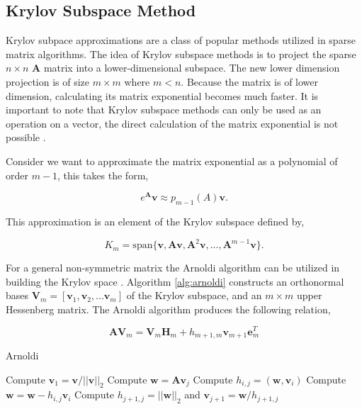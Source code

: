 \subsection{Krylov Subspace Method}
Krylov subpace approximations are a class of popular methods utilized in sparse matrix algorithms. The idea of Krylov subspace methods is to project the sparse $n \times n$ $\boldsymbol{A}$ matrix into a lower-dimensional subspace. The new lower dimension projection is of size $m \times m$ where $m < n$. Because the matrix is of lower dimension, calculating its matrix exponential becomes much faster. It is important to note that Krylov subspace methods can only be used as an operation on a vector, the direct calculation of the matrix exponential is not possible \cite{saad1992}.  

Consider we want to approximate the matrix exponential as a polynomial of order $m-1$, this takes the form,

\begin{equation}
    e^{\boldsymbol{A}}\boldsymbol{v} \approx p_{m-1}(A)\boldsymbol{v}.
    \label{eq:expPolynomailForm}
\end{equation}

\noindent This approximation is an element of the Krylov subspace defined by,

\begin{equation}
    K_{m} = \text{span}\{\boldsymbol{v}, \boldsymbol{A}\boldsymbol{v}, \boldsymbol{A}^{2}\boldsymbol{v}, ... ,\boldsymbol{A}^{m-1}\boldsymbol{v}\}.
\end{equation}

\noindent For a general non-symmetric matrix the Arnoldi algorithm can be utilized in building the Krylov space \cite{saad1992} \cite{saad1989}. Algorithm \ref{alg:arnoldi} constructs an orthonormal bases $\boldsymbol{V}_{m} = [\boldsymbol{v}_{1}, \boldsymbol{v}_{2}, ... \boldsymbol{v}_{m}]$ of the Krylov subspace, and an $m \times m$ upper Hessenberg matrix. The Arnoldi algorithm produces the following relation,

\begin{equation}
    \boldsymbol{A}\boldsymbol{V}_{m} = \boldsymbol{V}_{m}\boldsymbol{H}_{m} + h_{m+1,m}\boldsymbol{v}_{m+1}\boldsymbol{e}^{T}_{m}
    \label{eq:arnoldiResult}
\end{equation}

\begin{algorithm}
	\caption{Arnoldi} 
	\begin{algorithmic}[1]
	    \State Compute $\boldsymbol{v}_{1} = \boldsymbol{v}/||\boldsymbol{v}||_{2}$
            \State Compute $\boldsymbol{w} = \boldsymbol{A}\boldsymbol{v}_{j}$
                \State Compute $h_{i,j} = (\boldsymbol{w},\boldsymbol{v}_{i})$
                \State Compute $\boldsymbol{w} = \boldsymbol{w} - h_{i,j}\boldsymbol{v}_{i}$
            \EndFor
            \State Compute $h_{j+1, j} = ||\boldsymbol{w}||_{2}$ and $\boldsymbol{v}_{j+1} = \boldsymbol{w}/h_{j+1,j}$
		\EndFor
	\end{algorithmic} 
	\label{alg:arnoldi}
\end{algorithm}


